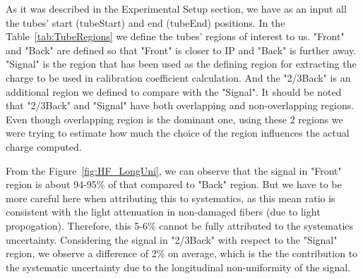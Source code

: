 As it was described in the Experimental Setup section, we have as an input all
the tubes' start (tubeStart) and end (tubeEnd) positions. In the Table~\ref{tab:TubeRegions} we define the tubes' regions of interest to us. "Front" and "Back" are defined so that "Front" is closer to IP and "Back" is further away.
"Signal" is the region that has been used as the defining region for extracting
the charge to be used in calibration coefficient calculation. And the "2/3Back"
is an additional region we defined to compare with the "Signal". It should be
noted that "2/3Back" and "Signal" have both overlapping and non-overlapping
regions. Even though overlapping region is the dominant one, using these 2 regions we were trying to estimate how much the choice of the region influences the actual charge computed.

From the Figure~\ref{fig:HF_LongUni}, we can observe that the signal in "Front" region is about 94-95\% of that compared to "Back" region. But we have to be more careful here when attributing this to systematics, as this mean ratio is consistent with the light attenuation in non-damaged fibers (due to light propogation). Therefore, this 5-6\% cannot be fully attributed to the systematics uncertainty. Considering the signal in "2/3Back" with respect to the "Signal" region, we observe a difference of 2\% on average, which is the the contribution to the systematic uncertainty due to the longitudinal non-uniformity of the signal.

